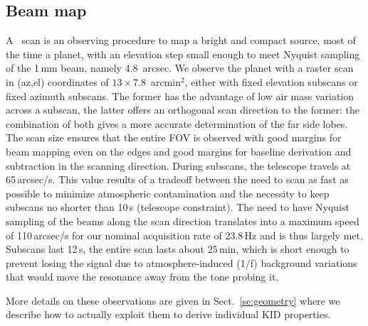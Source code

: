 

\subsection{Beam map}
\label{se:beammaps}

A \bm\ scan is an observing procedure to map a bright and compact
source, most of the time a planet, with
an elevation step small enough to meet Nyquist sampling of the 1\,mm beam,
namely 4.8~arcsec. We observe the planet with a raster scan in (az,el)
coordinates of $13\times7.8$~arcmin$^2$, either with fixed elevation subscans or
fixed azimuth subscans. The former has the advantage of low air mass variation
across a subscan, the latter offers an orthogonal scan direction to the former:
the combination of both gives a more accurate determination of the far side
lobes. The scan size ensures that the entire FOV is observed with good margins
for beam mapping even on the edges and good margins for baseline derivation and
subtraction in the scanning direction. During subscans, the telescope travels at
65\,arcsec/s. This value results of a tradeoff between the need to scan as
fast as possible to minimize atmospheric contamination and the
necessity to keep subscans no shorter than 10\,s (telescope
constraint). The need to have Nyquist sampling of
the beams along the scan direction translates into a maximum speed of 110\,arcsec/s
for our nominal acquisition rate of 23.8\,Hz and is thus largely met. Subscans
last 12\,s, the entire scan lasts about 25\,min, which is short enough to prevent
losing the signal due to atmosphere-induced (1/f) background variations that would
move the resonance away from the tone probing it.

More details on these observations are given in Sect.~\ref{se:geometry}
where we describe how to actually exploit them to derive individual KID
properties.

